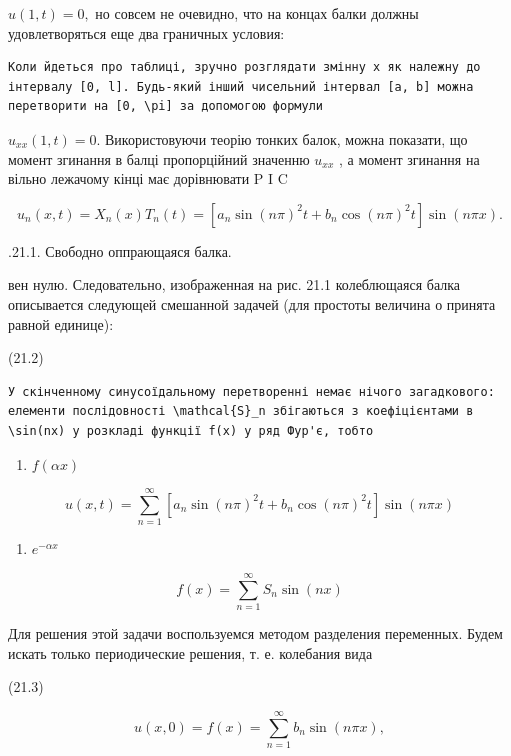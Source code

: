 \documentclass[
  ukrainian,
]{article}
\providecommand{\tightlist}{%
  \setlength{\itemsep}{0pt}\setlength{\parskip}{0pt}}
\begin{document}
\(u(1, t) = 0,\) но совсем не очевидно, что на концах балки должны
удовлетворяться еще два граничных условия:

\begin{verbatim}
Коли йдеться про таблиці, зручно розглядати змінну x як належну до інтервалу [0, l]. Будь-який інший чисельний інтервал [a, b] можна перетворити на [0, \pi] за допомогою формули
\end{verbatim}

\(u_{xx}(1, t) = 0.\) Використовуючи теорію тонких балок, можна
показати, що момент згинання в балці пропорційний значенню \(u_{xx}\) ,
а момент згинання на вільно лежачому кінці має дорівнювати P I C

\[
u_n(x, t) = X_n(x) T_n(t) = [a_n \sin(n\pi)^2 t + b_n \cos(n\pi)^2 t] \sin(n\pi x).
\]

.21.1. Свободно оппрающаяся балка.

вен нулю. Следовательно, изображенная на рис. 21.1 колеблющаяся балка
описывается следующей смешанной задачей (для простоты величина о принята
равной единице):

(21.2)

\begin{verbatim}
У скінченному синусоїдальному перетворенні немає нічого загадкового: елементи послідовності \mathcal{S}_n збігаються з коефіцієнтами в \sin(nx) у розкладі функції f(x) у ряд Фур'є, тобто
\end{verbatim}

\begin{enumerate}
\def\labelenumi{\arabic{enumi}.}
\setcounter{enumi}{1}
\tightlist
\item
  \(f(\alpha x)\)
\end{enumerate}

\[
u(x, t) = \sum_{n=1}^{\infty} \left[ a_n \sin(n\pi)^2 t + b_n \cos(n\pi)^2 t \right] \sin(n\pi x)
\]

\begin{enumerate}
\def\labelenumi{\arabic{enumi}.}
\setcounter{enumi}{2}
\tightlist
\item
  \(e^{-\alpha x}\)
\end{enumerate}

\[
f(x) = \sum_{n=1}^{\infty} S_n \sin(nx)
\]

Для решения этой задачи воспользуемся методом разделения переменных.
Будем искать только периодические решения, т. е. колебания вида

(21.3)

\[
u(x, 0) = f(x) = \sum_{n=1}^{\infty} b_n \sin(n\pi x),
\]
\end{document}
